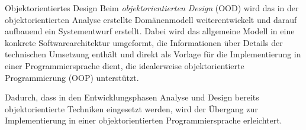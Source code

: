 \begin{defi}{Objektorientiertes Design}
    Beim \emph{objektorientierten Design} (OOD) wird das in der objektorientierten Analyse erstellte Domänenmodell weiterentwickelt und darauf aufbauend ein Systementwurf erstellt.
    Dabei wird das allgemeine Modell in eine konkrete Softwarearchitektur umgeformt, die Informationen über Details der technischen Umsetzung enthält und direkt als Vorlage für die Implementierung in einer Programmiersprache dient, die idealerweise objektorientierte Programmierung (OOP) unterstützt.

    Dadurch, dass in den Entwicklungsphasen Analyse und Design bereits objektorientierte Techniken eingesetzt werden, wird der Übergang zur Implementierung in einer objektorientierten Programmiersprache erleichtert.
\end{defi}
